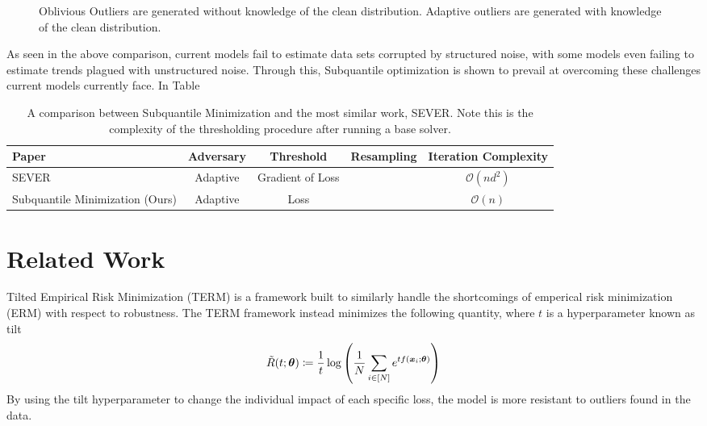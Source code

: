 \documentclass{article} %
\newcommand{\cmark}{\ding{51}}%
\newcommand{\xmark}{\ding{55}}%
\begin{document}
\begin{figure}[!t]
		\caption{Oblivious Outliers are generated without knowledge of the clean distribution. Adaptive outliers are generated with knowledge of the clean distribution.}
		\label{fig:structure-unstructured-noise}
	\end{figure}
	
	As seen in the above comparison, current models fail to estimate data sets corrupted by structured noise, with some models even failing to estimate trends plagued with unstructured noise. Through this, Subquantile optimization is shown to prevail at overcoming these challenges current models currently face. In Table 
	
	\begin{table}[!h]
		\centering
		\begin{tabular}{lcccc}
			\toprule 
			Paper & Adversary & Threshold & Resampling & Iteration Complexity\\   
			\midrule                
			SEVER \cite{DiakonikolasKKLSS19} & Adaptive & Gradient of Loss & \xmark & $\mathcal{O}(nd^2)$\\
			\midrule 
			Subquantile Minimization (Ours) & Adaptive & Loss & \cmark & $\mathcal{O}(n)$\\
			\bottomrule
		\end{tabular}
		\caption{A comparison between Subquantile Minimization and the most similar work, SEVER. Note this is the complexity of the thresholding procedure after running a base solver.}
		\label{tab:related-work}
	\end{table}
	
	\section{Related Work}
	
	Tilted Empirical Risk Minimization (TERM) \cite{li2020tilted} is a framework built to similarly handle the shortcomings of emperical risk minimization (ERM) with respect to robustness. The TERM framework instead minimizes the following quantity, where $t$ is a hyperparameter known as tilt
	\begin{equation}
		\tilde{R}(t;{\bm{\theta}}) \coloneqq \frac{1}{t} \log\left(\frac{1}{N}\sum_{i \in \left[N\right]}e^{tf({\bm{x}}_i;{\bm{\theta}})} \right)
	\end{equation}
	By using the tilt hyperparameter to change the individual impact of each specific loss, the model is more resistant to outliers found in the data.
	
\end{document}
